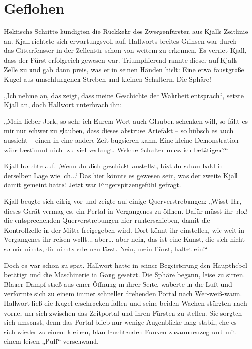 \newpage
\section{Geflohen}



Hektische Schritte kündigten die Rückkehr des Zwergenfürsten aus Kjalls Zeitlinie an. Kjall richtete sich erwartungsvoll auf. Hallworts breites Grinsen war durch das Gitterfenster in der Zellentür schon von weitem zu erkennen. Es verriet Kjall, dass der Fürst erfolgreich gewesen war. Triumphierend rannte dieser auf Kjalls Zelle zu und gab dann preis, was er in seinen Händen hielt: Eine etwa faustgroße Kugel aus umschlungenen Streben und kleinen Schaltern. Die Sphäre!

„Ich nehme an, das zeigt, dass meine Geschichte der Wahrheit entsprach“, setzte Kjall an, doch Hallwort unterbrach ihn:

„Mein lieber Jork, so sehr ich Eurem Wort auch Glauben schenken will, so fällt es mir nur schwer zu glauben, dass dieses abstruse Artefakt – so hübsch es auch aussieht – einen in eine andere Zeit bugsieren kann. Eine kleine Demonstration wäre bestimmt nicht zu viel verlangt. Welche Schalter muss ich betätigen?“

Kjall horchte auf. ‚Wenn du dich geschickt anstellst, bist du schon bald in derselben Lage wie ich...‘ Das hier könnte es gewesen sein, was der zweite Kjall damit gemeint hatte! Jetzt war Fingerspitzengefühl gefragt.

Kjall beugte sich eifrig vor und zeigte auf einige Querverstrebungen: „Wisst Ihr, dieses Gerät vermag es, ein Portal in Vergangenes zu öffnen. Dafür müsst ihr bloß die entsprechenden Querverstrebungen hier runterschieben, damit die Kontrollzelle in der Mitte freigegeben wird. Dort könnt ihr einstellen, wie weit in Vergangenes ihr reisen wollt... aber... aber nein, das ist eine Kunst, die sich nicht so mir nichts, dir nichts erlernen lässt. Nein, mein Fürst, haltet ein!“

Doch es war schon zu spät. Hallwort hatte in seiner Begeisterung den Haupthebel betätigt und die Maschinerie in Gang gesetzt. Die Sphäre begann, leise zu sirren. Blauer Dampf stieß aus einer Öffnung in ihrer Seite, waberte in die Luft und verformte sich zu einem immer schneller drehenden Portal nach Wer-weiß-wann. Hallwort ließ die Kugel erschrocken fallen und seine beiden Wachen stürzten nach vorne, um sich zwischen das Zeitportal und ihren Fürsten zu stellen. Sie sorgten sich umsonst, denn das Portal blieb nur wenige Augenblicke lang stabil, ehe es sich wieder zu einem kleinen, blau leuchtenden Funken zusammenzog und mit einem leisen „Puff“ verschwand.

